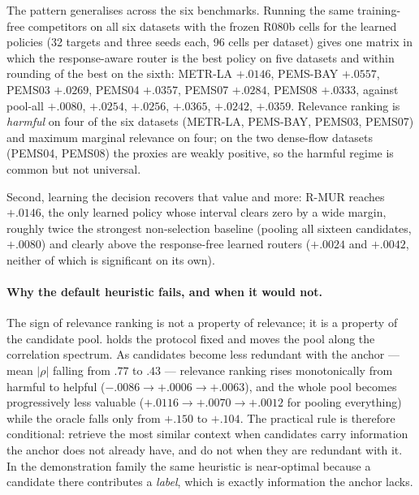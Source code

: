 The pattern generalises across the six benchmarks. Running the same training-free
competitors on all six datasets with the frozen R080b cells for the learned
policies (32 targets and three seeds each, 96 cells per dataset) gives one
matrix in which the response-aware router is the best policy on five datasets
and within rounding of the best on the sixth: METR-LA $+.0146$, PEMS-BAY
$+.0557$, PEMS03 $+.0269$, PEMS04 $+.0357$, PEMS07 $+.0284$, PEMS08 $+.0333$,
against pool-all $+.0080$, $+.0254$, $+.0256$, $+.0365$, $+.0242$, $+.0359$.
Relevance ranking is \emph{harmful} on four of the six datasets (METR-LA,
PEMS-BAY, PEMS03, PEMS07) and maximum marginal relevance on four; on the two
dense-flow datasets (PEMS04, PEMS08) the proxies are weakly positive, so the
harmful regime is common but not universal.

Second, learning the decision recovers that value and more: R-MUR reaches
$+.0146$, the only learned policy whose interval clears zero by a wide
margin, roughly twice the strongest non-selection baseline (pooling all sixteen
candidates, $+.0080$) and clearly above the response-free learned routers
($+.0024$ and $+.0042$, neither of which is significant on its own).

\paragraph{Why the default heuristic fails, and when it would not.}
The sign of relevance ranking is not a property of relevance; it is a property
of the candidate pool.  holds the protocol fixed and moves
the pool along the correlation spectrum. As candidates become less redundant
with the anchor --- mean $|\rho|$ falling from $.77$ to $.43$ --- relevance
ranking rises monotonically from harmful to helpful ($-.0086 \to +.0006 \to
+.0063$), and the whole pool becomes progressively less valuable ($+.0116 \to
+.0070 \to +.0012$ for pooling everything) while the oracle falls only from
$+.150$ to $+.104$. The practical rule is therefore conditional: retrieve the
most similar context when candidates carry information the anchor does not
already have, and do not when they are redundant with it. In the demonstration
family the same heuristic is near-optimal because a candidate there contributes
a \emph{label}, which is exactly information the anchor lacks.

